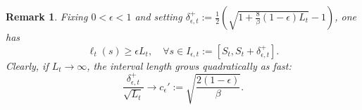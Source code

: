 \documentclass{article}
\newtheorem{remark}[theorem]{Remark}
\begin{document}
\begin{remark}  \label{rem delta+,epsilon,t}
Fixing $0<\epsilon<1$ and setting $\delta^+_{\epsilon,t}:=\frac{1}{2}\left(\sqrt{1+\frac{8}{\beta}(1-\epsilon)L_t}-1\right)$, one has\begin{equation}        \label{eq ell bounded below}
        \ell_t(s) \geq \epsilon L_t, \quad \forall s\in I_{\epsilon,t}
        :=\left[ S_t,S_t+\delta^+_{\epsilon,t} \right].
\end{equation}
Clearly, if $L_t\to\infty$, the interval length grows quadratically as fast:
$$\frac{\delta^+_{\epsilon,t}}{\sqrt{L_t}}\to c_\epsilon':=\sqrt{\frac{2(1-\epsilon)}{\beta}}.
$$
\end{remark}

\end{document}
